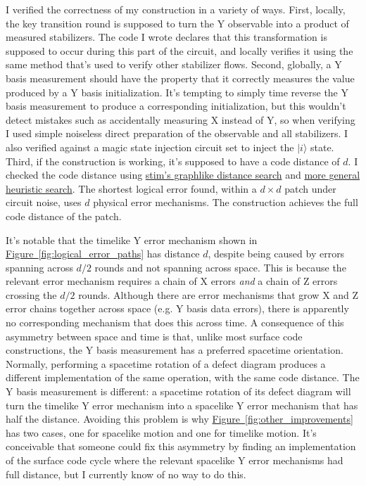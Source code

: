 \documentclass[onecolumn,unpublished,a4paper]{quantumarticle}
\theoremstyle{definition}
\theoremstyle{definition}
\theoremstyle{definition}
\newcommand{\fig}[1]{\hyperref[fig:#1]{Figure~\ref*{fig:#1}}}
\begin{document}
I verified the correctness of my construction in a variety of ways.
First, locally, the key transition round is supposed to turn the Y observable into a product of measured stabilizers.
The code I wrote declares that this transformation is supposed to occur during this part of the circuit, and locally verifies it using the same method that's used to verify other stabilizer flows.
Second, globally, a Y basis measurement should have the property that it correctly measures the value produced by a Y basis initialization.
It's tempting to simply time reverse the Y basis measurement to produce a corresponding initialization, but this wouldn't detect mistakes such as accidentally measuring X instead of Y, so when verifying I used simple noiseless direct preparation of the observable and all stabilizers.
I also verified against a magic state injection circuit set to inject the $|i\rangle$ state.
Third, if the construction is working, it's supposed to have a code distance of $d$.
I checked the code distance using \href{https://github.com/quantumlib/Stim/blob/main/doc/python_api_reference_vDev.md#stim.Circuit.shortest_graphlike_error}{stim's graphlike distance search} and \href{https://github.com/quantumlib/Stim/blob/main/doc/python_api_reference_vDev.md#stim.Circuit.search_for_undetectable_logical_errors}{more general heuristic search}.
The shortest logical error found, within a $d \times d$ patch under circuit noise, uses $d$ physical error mechanisms.
The construction achieves the full code distance of the patch.

It's notable that the timelike Y error mechanism shown in \fig{logical_error_paths} has distance $d$, despite being caused by errors spanning across $d/2$ rounds and not spanning across space.
This is because the relevant error mechanism requires a chain of X errors \emph{and} a chain of Z errors crossing the $d/2$ rounds.
Although there are error mechanisms that grow X and Z error chains together across space (e.g. Y basis data errors), there is apparently no corresponding mechanism that does this across time.
A consequence of this asymmetry between space and time is that, unlike most surface code constructions, the Y basis measurement has a preferred spacetime orientation.
Normally, performing a spacetime rotation of a defect diagram produces a different implementation of the same operation, with the same code distance.
The Y basis measurement is different: a spacetime rotation of its defect diagram will turn the timelike Y error mechanism into a spacelike Y error mechanism that has half the distance.
Avoiding this problem is why \fig{other_improvements} has two cases, one for spacelike motion and one for timelike motion.
It's conceivable that someone could fix this asymmetry by finding an implementation of the surface code cycle where the relevant spacelike Y error mechanisms had full distance, but I currently know of no way to do this.
\end{document}
